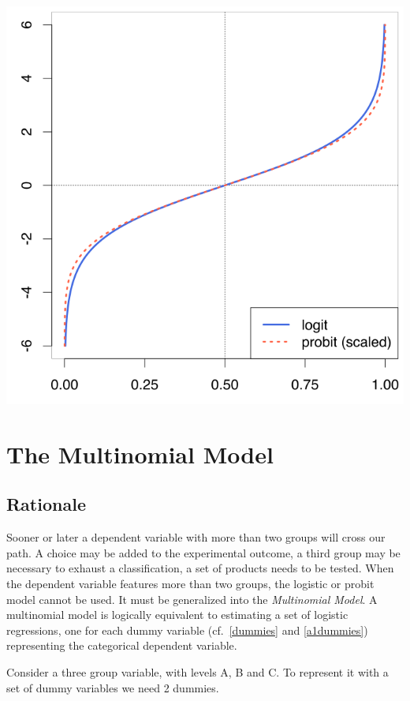 \documentclass[
]{book}
\begin{document}
\includegraphics[width=9.33in]{bookletpics/logitprobit}

\hypertarget{multinomial}{%
\section{The Multinomial Model}\label{multinomial}}

\hypertarget{rationale}{%
\subsection{Rationale}\label{rationale}}

Sooner or later a dependent variable with more than two groups will cross our path. A choice may be added to the experimental outcome, a third group may be necessary to exhaust a classification, a set of products needs to be tested. When the dependent variable features more than two groups, the logistic or probit model cannot be used. It must be generalized into the \emph{Multinomial Model}. A multinomial model is logically equivalent to estimating a set of logistic regressions, one for each dummy variable (cf.~\ref{dummies} and \ref{a1dummies}) representing the categorical dependent variable.

Consider a three group variable, with levels A, B and C. To represent it with a set of dummy variables we need 2 dummies.
\end{document}
